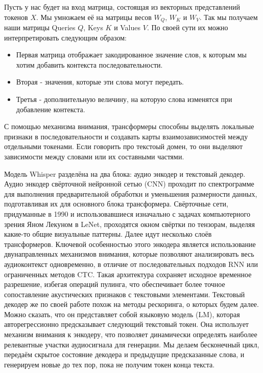 Пусть у нас будет на вход матрица, состоящая из векторных представлений токенов $X$.
Мы умножаем её на матрицы весов $W_Q$, $W_K$ и $W_V$.
Так мы получаем наши матрицы Queries $Q$, Keys $K$ и Values $V$.
По своей сути их можно интерпретировать следующим образом:
\begin{itemize}
  \item Первая матрица отображает закодированное значение слов, к которым мы хотим добавить контекста последовательности.
  \item Вторая - значения, которые эти слова могут передать.
  \item Третья - дополнительную величину, на которую слова изменятся при добавление контекста.
\end{itemize} 

С помощью механизма внимания, трансформеры способны выделять локальные признаки в последовательности и создавать карты взаимозависимостей между отдельными токенами.
Если говорить про текстоый домен, то они выделяют зависимости между словами или их составными частями.

Модель Whisper разделёна на два блока: аудио энкодер и текстовый декодер.
Аудио энкодер свёрточной нейронной сетью (CNN) проходит по спектрограмме для выполнения предварительной обработкн и уменьшения размерности данных, подготавливая их для основного блока трансформера.
Свёрточные сети, придуманные в 1990 и использовавшиеся изначально с задачах компьютерного зрения Яном Лекуном в LeNet, проходятся окном свёртки по тензорам, выделяя какие-то общие визуальные паттерны.
Далее идут несколько слоёв трансформеров.
Ключевой особенностью этого энкодера является использование двунаправленных механизмов внимания, которые позволяют анализировать весь аудиоконтекст одновременно, в отличие от последовательных подходов RNN или ограниченных методов CTC.
Такая архитектура сохраняет исходное временное разрешение, избегая операций пулинга, что обеспечивает более точное сопоставление акустических признаков с текстовыми элементами.
Текстовый декодер же по своей работе  похож на методы рескоринга, о которых будем далее.
Можно сказать, что он представляет собой языковую модель (LM), которая авторегрессионно предсказывает следующий текстовый токен.
Она использует механизм внимания к энкодеру, что позволяет динамически определять наиболее релевантные участки аудиосигнала для генерации.
Мы делаем бесконечный цикл, передаём скрытое состояние декодера и предыдущие предсказанные слова, и генерируем новые до тех пор, пока не получим токен конца текста.

